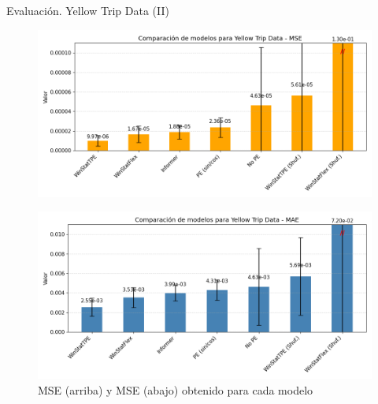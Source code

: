 \documentclass[compress]{beamer}
\begin{document}
	\begin{frame}{Evaluación. Yellow Trip Data (II)}
			\begin{figure}
			\includegraphics[scale=0.22]{pic/taxifinalmse.png}
		\end{figure}
		
		\begin{figure}
			\includegraphics[scale=0.22]{pic/taxifinalmae.png}
			\caption[]{MSE (arriba) y MSE (abajo) obtenido para cada modelo}
		\end{figure}
	\end{frame}
\end{document}
